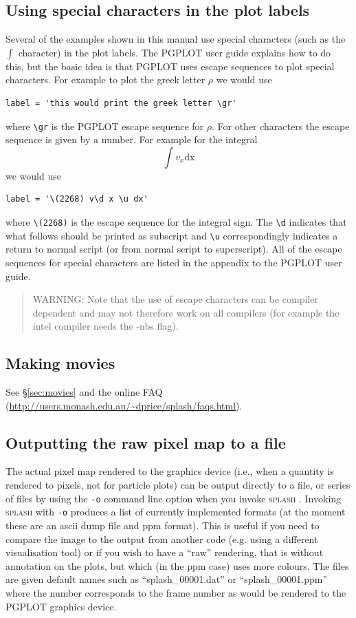 \documentclass[a4paper,10pt]{article}
\newcommand{\splash}{\textsc{splash }}
\begin{document}
\subsection{Using special characters in the plot labels}
 Several of the examples shown in this manual use special characters (such as
the $\int$ character) in the plot labels. The PGPLOT user guide explains how to do
this, but the basic idea is that PGPLOT uses escape sequences to plot special
characters. For example to plot the greek letter $\rho$ we would use
\begin{verbatim}
label = 'this would print the greek letter \gr'
\end{verbatim}
where \verb+\gr+ is the PGPLOT escape sequence for $\rho$. For other
characters the escape sequence is given by a number. For example for the integral 
\begin{equation}
\int v_x \mathrm{dx}
\end{equation}
we would use
\begin{verbatim}
label = '\(2268) v\d x \u dx'
\end{verbatim}
where \verb+\(2268)+ is the escape sequence for the integral sign. The
\verb+\d+ indicates that what follows should be printed as subscript and
\verb+\u+ correspondingly indicates a return to normal script (or from normal script to
superscript). All of the escape sequences for special characters are listed in
the appendix to the PGPLOT user guide.
\begin{quote}
 WARNING: Note that the use of escape characters can be compiler dependent and
 may not therefore work on all compilers (for example the intel compiler needs
 the -nbs flag).
\end{quote}

\subsection{Making movies}
See \S\ref{sec:movies} and the online FAQ (\url{http://users.monash.edu.au/~dprice/splash/faqs.html}).

\subsection{Outputting the raw pixel map to a file}
\label{sec:writepixmap}
 The actual pixel map rendered to the graphics device (i.e., when a quantity is rendered to pixels, not for particle plots) can be output directly to a file, or series of files by using the \verb+-o+ command line option when you invoke \splash. Invoking \splash with \verb+-o+ produces a list of currently implemented formats (at the moment these are an ascii dump file and ppm format). This is useful if you need to compare the image to the output from another code (e.g. using a different visualisation tool) or if you wish to have a ``raw'' rendering, that is without annotation on the plots, but which (in the ppm case) uses more colours. The files are given default names such as ``splash\_00001.dat'' or ``splash\_00001.ppm'' where the number corresponds to the frame number as would be rendered to the PGPLOT graphics device.
 
\end{document}
